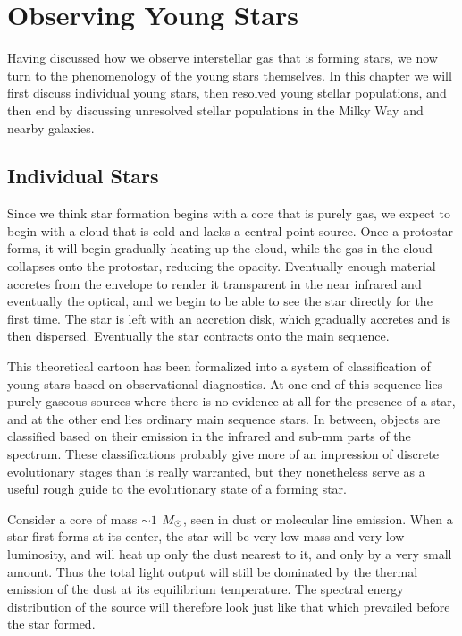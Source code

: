 \chapter{Observing Young Stars}
\label{ch:obsstars}

Having discussed how we observe interstellar gas that is forming stars, we now turn to the phenomenology of the young stars themselves. In this chapter we will first discuss individual young stars, then resolved young stellar populations, and then end by discussing unresolved stellar populations in the Milky Way and nearby galaxies.

\section{Individual Stars}

Since we think star formation begins with a core that is purely gas, we expect to begin with a cloud that is cold and lacks a central point source. Once a protostar forms, it will begin gradually heating up the cloud, while the gas in the cloud collapses onto the protostar, reducing the opacity. Eventually enough material accretes from the envelope to render it transparent in the near infrared and eventually the optical, and we begin to be able to see the star directly for the first time. The star is left with an accretion disk, which gradually accretes and is then dispersed. Eventually the star contracts onto the main sequence.

This theoretical cartoon has been formalized into a system of classification of young stars based on observational diagnostics. At one end of this sequence lies purely gaseous sources where there is no evidence at all for the presence of a star, and at the other end lies ordinary main sequence stars. In between, objects are classified based on their emission in the infrared and sub-mm parts of the spectrum. These classifications probably give more of an impression of discrete evolutionary stages than is really warranted, but they nonetheless serve as a useful rough guide to the evolutionary state of a forming star.

Consider a core of mass $\sim 1$ $M_{\odot}$, seen in dust or molecular line emission. When a star first forms at its center, the star will be very low mass and very low luminosity, and will heat up only the dust nearest to it, and only by a very small amount. Thus the total light output will still be dominated by the thermal emission of the dust at its equilibrium temperature. The spectral energy distribution of the source will therefore look just like that which prevailed before the star formed.

